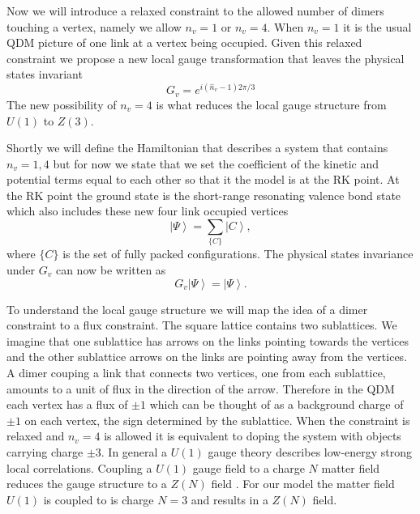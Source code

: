 \documentclass[aps,floatfix,11pt]{revtex4-1}
\begin{document}
Now we will introduce a relaxed constraint to the allowed number of dimers touching a vertex, namely we allow
$n_v = 1$ or $n_v = 4$. When $n_v=1$ it is the usual QDM picture of one link at a vertex being
occupied.  
Given this relaxed
constraint we propose a new local gauge transformation that leaves the physical states invariant
%
\begin{equation}
    \label{}
    G_v = e^{i (\hat{n}_v -1) 2\pi/3}    
\end{equation}
%
The new possibility of $n_v = 4$ is what reduces the local gauge structure from $U(1)$ to $Z(3)$. 

Shortly we will define the Hamiltonian that describes a system that contains $n_v =1,4$ but for now
we state that we set the coefficient of the kinetic and potential terms equal to each other so that
it the model is at the RK point.  At the RK point the ground state is the short-range resonating
valence bond state which also includes these new four link occupied vertices
%
\begin{equation}
    \label{}
    \left| \Psi \right\rangle = \sum_{\{C\}} \left| C \right\rangle
    ,
\end{equation}
% 
where $\{C\}$ is the set of fully packed configurations. The physical states invariance under $G_v$
can now be written as 
\begin{equation}
    \label{}
    G_v \left| \Psi \right\rangle = \left| \Psi \right\rangle
    .
\end{equation}


To understand the local gauge structure we will map the idea of a dimer constraint to a flux
constraint. The square lattice contains two sublattices. We imagine that one sublattice has arrows
on the links pointing towards the vertices and the other sublattice arrows on the links are pointing
away from the vertices. A dimer couping a link that connects two vertices, one from each sublattice,
amounts to a unit of flux in the direction of the arrow. Therefore in the QDM each vertex has a flux
of $\pm 1$ which can be thought of as a background charge of
$\pm 1$ on each vertex, the sign determined by the sublattice. When the constraint is relaxed and $n_v =4$ is
allowed it is equivalent to doping the system with objects carrying charge $\pm 3$. 
In general a $U(1)$ gauge theory describes low-energy strong local correlations.
Coupling a $U(1)$ gauge field to a charge $N$ matter field reduces the gauge structure to a $Z(N)$ 
field \cite{fradkin and shenker}. For our model the matter field $U(1)$ is coupled to is
charge $N=3$ and results in a $Z(N)$ field.
\end{document}

